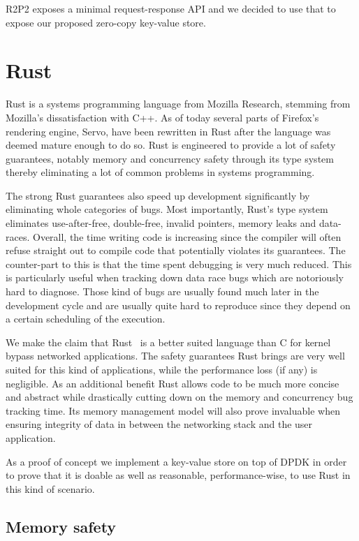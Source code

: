 R2P2 exposes a minimal request-response API and we decided to use that
to expose our proposed zero-copy key-value store.

\section{Rust}

Rust is a systems programming language from Mozilla Research, stemming
from Mozilla's dissatisfaction with C++. As of today several parts of
Firefox's rendering engine, Servo, have been rewritten in Rust after
the language was deemed mature enough to do so. Rust is engineered to
provide a lot of safety guarantees, notably memory and concurrency
safety through its type system thereby eliminating a lot of common
problems in systems programming.

The strong Rust guarantees also speed up development significantly by
eliminating whole categories of bugs. Most importantly, Rust's type system
eliminates use-after-free, double-free, invalid pointers, memory leaks
and data-races. Overall, the time writing code is increasing since the
compiler will often refuse straight out to compile code that
potentially violates its guarantees. The counter-part to this is that
the time spent debugging is very much reduced. This is particularly
useful when tracking down data race bugs which are notoriously hard to
diagnose. Those kind of bugs are usually found much later in the
development cycle and are usually quite hard to reproduce since they
depend on a certain scheduling of the execution.

We make the claim that Rust~\cite{rustbook} is a better suited
language than C for kernel bypass networked applications. The safety
guarantees Rust brings are very well suited for this kind of
applications, while the performance loss (if any) is negligible. As an
additional benefit Rust allows code to be much more concise and
abstract while drastically cutting down on the memory and concurrency
bug tracking time. Its memory management model will also prove
invaluable when ensuring integrity of data in between the networking
stack and the user application.

As a proof of concept we implement a key-value store on top of
DPDK in order to prove that it is doable as well as reasonable,
performance-wise, to use Rust in this kind of scenario.


\subsection{Memory safety}

